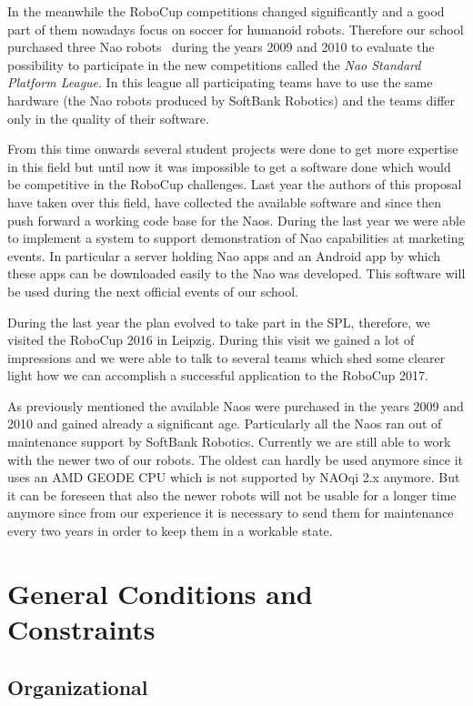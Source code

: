 \documentclass[12pt]{article}
\theoremstyle{definition}
\begin{document}
In the meanwhile the RoboCup competitions changed significantly and a good part of them nowadays focus on soccer for humanoid robots. Therefore our school purchased three Nao robots~\cite{softbank_robotics_who_2016} during the years 2009 and 2010 to evaluate the possibility to participate in the new competitions called the {\em Nao Standard Platform League}. In this league all participating teams have to use the same hardware (the Nao robots produced by SoftBank Robotics) and the teams differ only in the quality of their software.

From this time onwards several student projects were done to get more expertise in this field but until now it was impossible to get a software done which would be competitive in the RoboCup challenges. Last year the authors of this proposal have taken over this field, have collected the available software and since then push forward a working code base for the Naos. During the last year we were able to implement a system to support demonstration of Nao capabilities at marketing events. In particular a server holding Nao apps and an Android app by which these apps can be downloaded easily to the Nao was developed. This software will be used during the next official events of our school.

During the last year the plan evolved to take part in the SPL, therefore, we visited the RoboCup 2016 in Leipzig. During this visit we gained a lot of impressions and we were able to talk to several teams which shed some clearer light how we can accomplish a successful application to the RoboCup 2017.

As previously mentioned the available Naos were purchased in the years 2009 and 2010 and gained already a significant age. Particularly all the Naos ran out of maintenance support by SoftBank Robotics. Currently we are still able to work with the newer two of our robots. The oldest can hardly be used anymore since it uses an AMD GEODE CPU which is not supported by NAOqi 2.x anymore\cite{inbar_new_2014}. But it can be foreseen that also the newer robots will not be usable for a longer time anymore since from our experience it is necessary to send them for maintenance every two years in order to keep them in a workable state.

 
\section{General Conditions and Constraints}
\subsection{Organizational}
\end{document}
